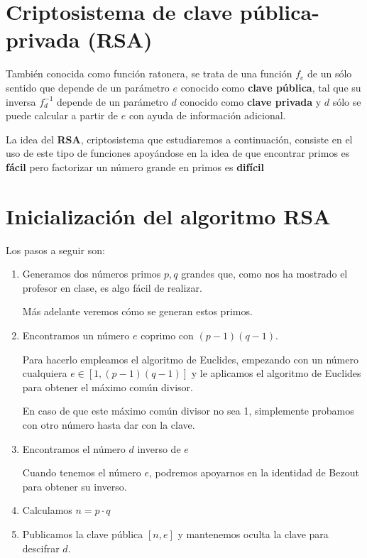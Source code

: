 \section{Criptosistema de clave pública-privada (RSA)}

\begin{defn}
También conocida como función ratonera, se trata de una función $f_e$ de un sólo sentido que depende de un parámetro $e$ conocido como \textbf{clave pública}, tal que su inversa $f^{-1}_d$ depende de un parámetro $d$ conocido como \textbf{clave privada} y $d$ sólo se puede calcular a partir de $e$ con ayuda de información adicional.
\end{defn}

La idea del \textbf{RSA}, criptosistema que estudiaremos a continuación, consiste en el uso de este tipo de funciones apoyándose en la idea de que encontrar primos es \textbf{fácil} pero factorizar un número grande en primos es \textbf{difícil}

\section{Inicialización del algoritmo RSA}
Los pasos a seguir son:
\begin{enumerate}
\item Generamos dos números primos $p,q$ grandes que, como nos ha mostrado el profesor en clase, es algo fácil de realizar.

Más adelante veremos cómo se generan estos primos.

\item Encontramos un número $e$ coprimo con $(p-1)(q-1)$.

Para hacerlo empleamos el algoritmo de Euclides, empezando con un número cualquiera $e\in [1, (p-1)(q-1)]$ y le aplicamos el algoritmo de Euclides para obtener el máximo común divisor.

En caso de que este máximo común divisor no sea 1, simplemente probamos con otro número hasta dar con la clave.

\item Encontramos el número $d$ inverso de $e$

Cuando tenemos el número $e$, podremos apoyarnos en la identidad de Bezout para obtener su inverso.

\item Calculamos $n=p\cdot q$

\item Publicamos la clave pública $[n,e]$ y mantenemos oculta la clave para descifrar $d$.
\end{enumerate}

